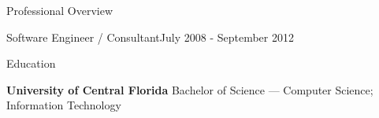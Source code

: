 \documentclass{resume} %
\begin{document}
\begin{rSection}{Professional Overview}
  
  \begin{rCompany}{Software Engineer / Consultant}{July 2008 - September 2012}{}

  \end{rCompany}
  
  
  
\end{rSection}

\vspace{0.5em} %
\begin{rSection}{Education}
  
  {\bf University of Central Florida } Bachelor of Science --- Computer Science; Information Technology
  
\end{rSection}
\end{document}
